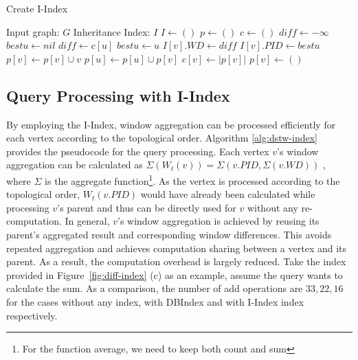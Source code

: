 \begin{algorithm}[h]
\label{alg:piconstruction}
\caption{Create I-Index}
\begin{algorithmic}[1]
\Require Input graph: $G$ 
\Ensure Inheritance Index: $I$ 
\State $I \leftarrow ()$
\State $p \leftarrow ()$ 
\State $c \leftarrow ()$ 
\State $diff \leftarrow -\infty$ 
\State $bestu \leftarrow nil$
 \label{algo:tp-step1-start}
		\State $diff \leftarrow c[u]$
		\State $bestu \leftarrow u$
	\EndIf
\EndFor \label{algo:tp-step1-stop}
\State $I[v].WD \leftarrow diff$
\State $I[v].PID \leftarrow bestu$
\State $p[v] \leftarrow p[v] \cup v$
 \label{algo:tp-step2-start}
	\State $p[u] \leftarrow p[u] \cup p[v]$
\EndFor \label{algo:tp-step2-stop}
\State $c[v] \leftarrow |p[v]|$ 
\State $p[v] \leftarrow ()$ 
\EndFor
\end{algorithmic}
\label{algo:piconstruction}
\end{algorithm}



\subsection{Query Processing with I-Index}
By employing the I-Index, window aggregation can be processed efficiently 
for each vertex according to 
the topological order. Algorithm \ref{alg:dstw-index} 
provides the pseudocode for the query processing. 
Each vertex $v$'s window aggregation can be calculated 
as 
$\Sigma (W_t(v)) = \Sigma (v.PID,\Sigma(v.WD))$
, where $\Sigma$ is the aggregate function\footnote{For the function average, we need to keep both count and sum}. As the vertex is 
processed according to the topological order, $W_t(v.PID)$ 
would have already been calculated while processing $v$'s parent and 
thus can be directly used for $v$ without any re-computation. 
In general, $v$'s window aggregation is achieved by reusing its 
parent's aggregated result and corresponding window differences.
This avoids repeated aggregation and achieves 
computation sharing between a vertex and its parent. 
As a result, the computation overhead is largely reduced. 
Take the index  provided in Figure~\ref{fig:diff-index} (c) as an example, 
assume the query wants to calculate the sum. As a comparison, the number of add operations 
are $33, 22, 16$ for the cases without any index, 
with DBIndex and with I-Index index respectively. 


